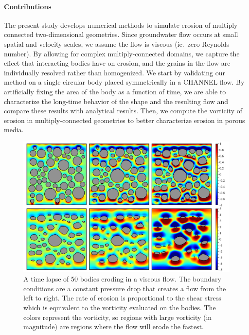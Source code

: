 \documentclass[preprint, 10pt]{elsarticle}
\begin{document}
\paragraph{Contributions} The present study develops numerical methods
to simulate erosion of multiply-connected two-dimensional geometries.
Since groundwater flow occurs at small spatial and velocity scales, we
assume the flow is viscous (ie.~zero Reynolds number).  By allowing for
complex multiply-connected domains, we capture the effect that
interacting bodies have on erosion, and the grains in the flow are
individually resolved rather than homogenized.  We start by validating
our method on a single circular body placed symmetrically in a CHANNEL
flow.  By artificially fixing the area of the body as a function of
time, we are able to characterize the long-time behavior of the shape
and the resulting flow and compare these results with analytical
results.  Then, we compute the vorticity of erosion in
multiply-connected geometries to better characterize erosion in porous
media. 

\begin{figure}%
\begin{center}
\includegraphics[width = 0.9 \textwidth]{./figs/50bod.pdf}
\caption{\label{fig:50bodies} A time lapse of 50 bodies eroding in a
viscous flow.  The boundary conditions are a constant pressure drop that
creates a flow from the left to right.  The rate of erosion is
proportional to the shear stress which is equivalent to the vorticity
evaluated on the bodies.  The colors represent the vorticity, so regions
with large vorticity (in magnitude) are regions where the flow will
erode the fastest.}
\end{center}
\end{figure}
\end{document}

